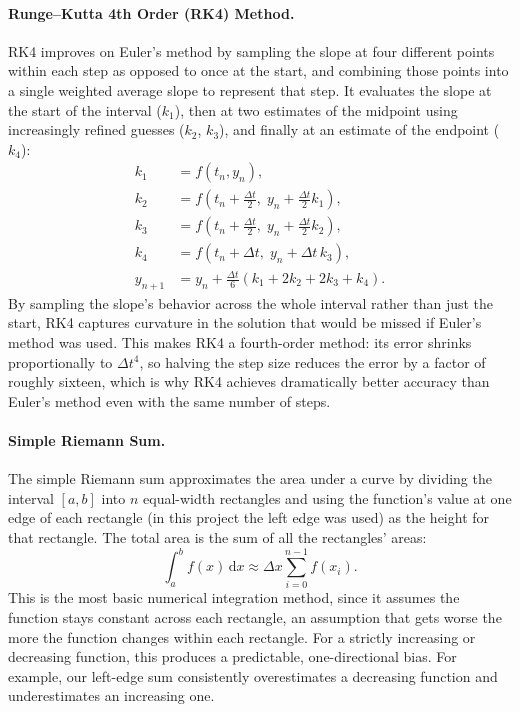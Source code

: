 \documentclass[11pt]{article}
\newcommand{\dd}{\mathrm{d}}
\begin{document}
\paragraph{Runge--Kutta 4th Order (RK4) Method.} RK4 improves on Euler's method by sampling the slope at four different points within each step as opposed to once at the start, and combining those points into a single weighted average slope to represent that step. It evaluates the slope at the start of the interval ($k_1$), then at two estimates of the midpoint using increasingly refined guesses ($k_2$, $k_3$), and finally at an estimate of the endpoint ($k_4$):
\begin{align}
  k_1 &= f(t_n, y_n), \\
  k_2 &= f\!\left(t_n + \tfrac{\Delta t}{2},\; y_n + \tfrac{\Delta t}{2} k_1\right), \\
  k_3 &= f\!\left(t_n + \tfrac{\Delta t}{2},\; y_n + \tfrac{\Delta t}{2} k_2\right), \\
  k_4 &= f\!\left(t_n + \Delta t,\; y_n + \Delta t\, k_3\right), \\
  y_{n+1} &= y_n + \frac{\Delta t}{6}\left(k_1 + 2k_2 + 2k_3 + k_4\right).
\end{align}
By sampling the slope's behavior across the whole interval rather than just the start, RK4 captures curvature in the solution that would be missed if Euler's method was used. This makes RK4 a fourth-order method: its error shrinks proportionally to $\Delta t^4$, so halving the step size reduces the error by a factor of roughly sixteen, which is why RK4 achieves dramatically better accuracy than Euler's method even with the same number of steps.

\paragraph{Simple Riemann Sum.} The simple Riemann sum approximates the area under a curve by dividing the interval $[a,b]$ into $n$ equal-width rectangles and using the function's value at one edge of each rectangle (in this project the left edge was used) as the height for that rectangle. The total area is the sum of all the rectangles' areas:
\begin{equation}
  \int_a^b f(x)\,\dd x \approx \Delta x \sum_{i=0}^{n-1} f(x_i).
\end{equation}
This is the most basic numerical integration method, since it assumes the function stays constant across each rectangle, an assumption that gets worse the more the function changes within each rectangle. For a strictly increasing or decreasing function, this produces a predictable, one-directional bias. For example, our left-edge sum consistently overestimates a decreasing function and underestimates an increasing one.
\end{document}
